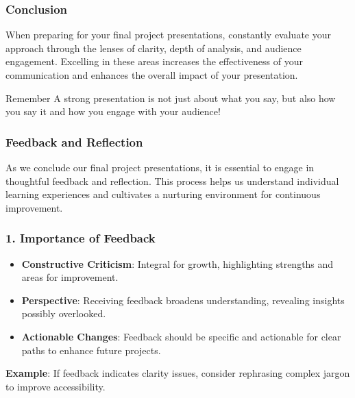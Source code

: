 \documentclass[aspectratio=169]{beamer}
\begin{document}
\begin{frame}[fragile]
    \frametitle{Conclusion}
    When preparing for your final project presentations, constantly evaluate your approach 
    through the lenses of clarity, depth of analysis, and audience engagement. 
    Excelling in these areas increases the effectiveness of your communication and enhances the overall impact of your presentation.

    \begin{block}{Remember}
        A strong presentation is not just about what you say, but also how you say it and how you engage with your audience!
    \end{block}
\end{frame}

\begin{frame}[fragile]
    \frametitle{Feedback and Reflection}
    As we conclude our final project presentations, it is essential to engage in thoughtful feedback and reflection.
    This process helps us understand individual learning experiences and cultivates a nurturing environment for continuous improvement.
\end{frame}

\begin{frame}[fragile]
    \frametitle{1. Importance of Feedback}
    \begin{itemize}
        \item \textbf{Constructive Criticism}: Integral for growth, highlighting strengths and areas for improvement.
        \item \textbf{Perspective}: Receiving feedback broadens understanding, revealing insights possibly overlooked.
        \item \textbf{Actionable Changes}: Feedback should be specific and actionable for clear paths to enhance future projects.
    \end{itemize}
    
    \textbf{Example}: If feedback indicates clarity issues, consider rephrasing complex jargon to improve accessibility.
\end{frame}
\end{document}
